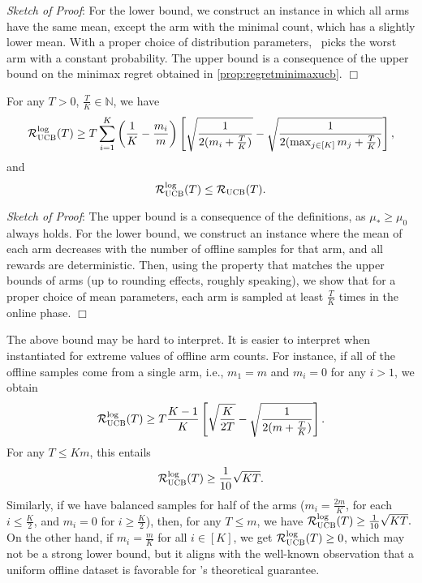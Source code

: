 \textit{Sketch of Proof}: For the lower bound, we construct an instance in which all arms have the same mean, except the arm with the minimal count, which has a slightly lower mean. With a proper choice of distribution parameters, \algucb\ picks the worst arm with a constant probability. The upper bound is a consequence of the upper bound on the minimax regret obtained in \cref{prop:regretminimaxucb}. \hfill \( \Box\)

\begin{proposition}\label{prop:lowerboundUCBanyT}
For any $T>0$, $\frac{T}{K}\in \mathbb{N}$, we have
    \[\mathcal{R}^{\text{log}}_{\textsc{UCB}}(T)\geq T\sum_{i=1}^K\left(\frac{1}{K}-\frac{m_i}{m}\right)\left[\sqrt{\frac{1}{2(m_i+\frac{T}{K})}}-\sqrt{\frac{1}{2(\max_{j\in [K]}m_j+\frac{T}{K})}}\right],\]
and
\[
\mathcal{R}^{\text{log}}_{\textsc{UCB}}(T)\leq \mathcal{R}_{\textsc{UCB}}(T).
\]
\end{proposition}

\textit{Sketch of Proof}: The upper bound is a consequence of the definitions, as $\mu_*\geq \mu_0$ always holds. For the lower bound, we construct an instance where the mean of each arm decreases with the number of offline samples for that arm, and all rewards are deterministic. Then, using the property that \algucb matches the upper bounds of arms (up to rounding effects, roughly speaking), we show that for a proper choice of mean parameters, each arm is sampled at least $\frac{T}{K}$ times in the online phase.  \hfill \( \Box\)

The above bound may be hard to interpret. It is easier to interpret when instantiated for extreme values of offline arm counts. For instance, if all of the offline samples come from a single arm, i.e., $m_1=m$ and $m_i=0$ for any $i>1$, we obtain
    \[\mathcal{R}^{\text{log}}_{\textsc{UCB}}(T)\geq T\frac{K-1}{K}\left[\sqrt{\frac{K}{2T}}-\sqrt{\frac{1}{2(m+\frac{T}{K})}}\right].\]
For any $T\leq K m$, this entails
    \[\mathcal{R}^{\text{log}}_{\textsc{UCB}}(T)\geq \frac{1}{10}\sqrt{KT}.\]
Similarly, if we have balanced samples for half of the arms ($m_i=\frac{2m}{K}$, for each $i \leq \frac{K}{2}$, and $m_i=0$ for $i\geq \frac{K}{2}$), then, for any $T\leq m$, we have
        $\mathcal{R}^{\text{log}}_{\textsc{UCB}}(T)\geq \frac{1}{10}\sqrt{KT}.$
On the other hand, if $m_i=\frac{m}{K}$ for all $i \in [K]$, we get $\mathcal{R}^{\text{log}}_{\textsc{UCB}}(T)\geq 0$, which may not be a strong lower bound, but it aligns with the well-known observation that a uniform offline dataset is favorable for \algucb's theoretical guarantee. 


